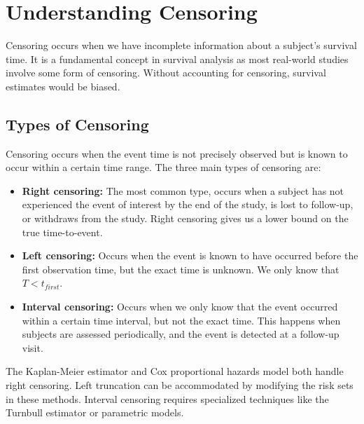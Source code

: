 \section{Understanding Censoring}
\label{sec:understanding-censoring}

Censoring occurs when we have incomplete information about a subject's survival time. It is a fundamental concept in survival analysis as most real-world studies involve some form of censoring. Without accounting for censoring, survival estimates would be biased.

\subsection{Types of Censoring}
\label{subsec:types-of-censoring}



\begin{definitionbox}[title=Censoring Types]
Censoring occurs when the event time is not precisely observed but is known to occur within a certain time range. The three main types of censoring are:
\begin{itemize}
    \item \textbf{Right censoring:} The most common type, occurs when a subject has not experienced the event of interest by the end of the study, is lost to follow-up, or withdraws from the study. Right censoring gives us a lower bound on the true time-to-event.
    
    \item \textbf{Left censoring:} Occurs when the event is known to have occurred before the first observation time, but the exact time is unknown. We only know that $T < t_{first}$.
    
    \item \textbf{Interval censoring:} Occurs when we only know that the event occurred within a certain time interval, but not the exact time. This happens when subjects are assessed periodically, and the event is detected at a follow-up visit.
\end{itemize}
\end{definitionbox}

The Kaplan-Meier estimator and Cox proportional hazards model both handle right censoring. Left truncation can be accommodated by modifying the risk sets in these methods. Interval censoring requires specialized techniques like the Turnbull estimator or parametric models.


